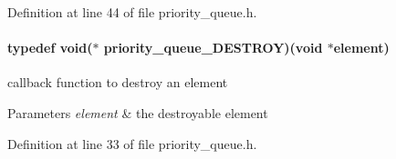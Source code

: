 Definition at line 44 of file priority\-\_\-queue.\-h.

\hypertarget{a00011_a8b0749461227267e0856a15ce59854c1}{
\paragraph[{priority\-\_\-queue\-\_\-\-D\-E\-S\-T\-R\-O\-Y}]{\setlength{\rightskip}{0pt plus 5cm}typedef void($\ast$ priority\-\_\-queue\-\_\-\-D\-E\-S\-T\-R\-O\-Y)(void $\ast$element)}}\label{a00011_a8b0749461227267e0856a15ce59854c1}


callback function to destroy an element 


\begin{DoxyParams}{Parameters}
{\em element} & the destroyable element \\
\hline
\end{DoxyParams}


Definition at line 33 of file priority\-\_\-queue.\-h.



